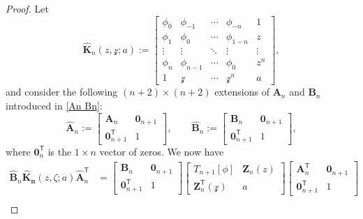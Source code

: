 \documentclass[pdftex]{sigma}
\numberwithin{equation}{section}
\newcommand{\ze}{\zeta}
\begin{document}
		\begin{proof}
			Let
			\begin{equation*}
				\boldsymbol{\widehat{K}}_{n}(z,\mathcal{z};a) := \begin{bmatrix}
					\phi_{0} & \phi_{-1} & \cdots & \phi_{-n} & 1\\
					\phi_{1} & \phi_{0} & \cdots & \phi_{1-n} & z\\
					\vdots & \vdots & \ddots & \vdots & \vdots\\
					\phi_{n} & \phi_{n-1} & \cdots & \phi_{0} & z^{n} \\
					1 & \mathcal{z} & \cdots & \mathcal{z}^{n} & a
				\end{bmatrix},
			\end{equation*}
			and consider the following $(n+2)\times(n+2)$ extensions of $\boldsymbol{A}_{n}$ and $ \boldsymbol{B}_{n}$ introduced in \eqref{An Bn}:
			\begin{equation*}
				\boldsymbol{\widehat{A}}_{n}:=\begin{bmatrix}
					\boldsymbol{A}_{n} & \boldsymbol{0}_{n+1} \\
					\boldsymbol{0}^{\mathsf T}_{n+1} & 1
				\end{bmatrix}, \qquad 	\boldsymbol{\widehat{B}}_{n}:=\begin{bmatrix}
					\boldsymbol{B}_{n} & \boldsymbol{0}_{n+1} \\
					\boldsymbol{0}^{\mathsf T}_{n+1} & 1
				\end{bmatrix},
			\end{equation*}
			where $\boldsymbol{0}^{\mathsf T}_{n}$ is the $1\times n$ vector of zeros. We now have
			\begin{align}
					\boldsymbol{\widehat{B}}_{n}
					\boldsymbol{\widehat{K}_{n}}(z,\ze;a)
					\boldsymbol{\widehat{A}}_{n}^{\mathsf T} & = \begin{bmatrix}
						\boldsymbol{B}_{n} & \boldsymbol{0}_{n+1} \\
						\boldsymbol{0}^{\mathsf T}_{n+1} & 1
					\end{bmatrix} \begin{bmatrix}
						T_{n+1}[\phi] & \boldsymbol{Z}_{n}(z) \\
						\boldsymbol{Z}^{\mathsf T}_{n}(\mathcal{z}) & a
					\end{bmatrix} \begin{bmatrix}
						\boldsymbol{A}^{\mathsf T}_{n} & \boldsymbol{0}_{n+1} \\
						\boldsymbol{0}^{\mathsf T}_{n+1} & 1
					\end{bmatrix} \nonumber\\

\end{align}
\end{proof}
\end{document}
